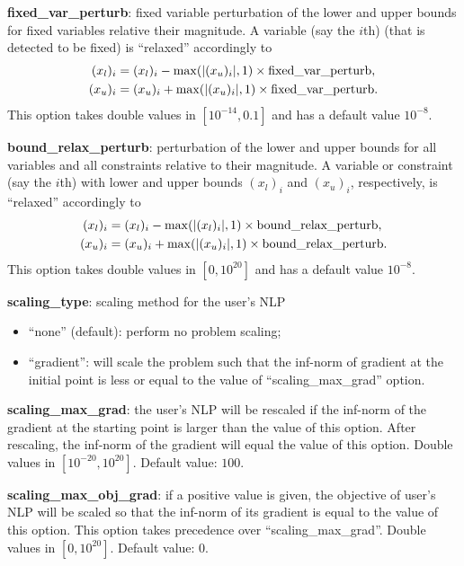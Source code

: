 \noindent \textbf{fixed\_var\_perturb}: fixed variable perturbation of the lower and upper bounds for fixed variables relative their  magnitude. A variable (say the $i$th) (that is detected to be fixed) is ``relaxed'' accordingly to 
\begin{align*}
(x_l)_i & =  (x_l)_i -  \max(|(x_u)_i|,1) \times \textnormal{fixed\_var\_perturb}, \\
(x_u)_i & =  (x_u)_i +  \max(|(x_u)_i|,1) \times \textnormal{fixed\_var\_perturb}.
\end{align*}
This option takes double values in $[10^{-14}, 0.1]$ and has a default value $10^{-8}$.
\medskip

\noindent \textbf{bound\_relax\_perturb}: perturbation of the lower and upper bounds for all variables and all constraints relative to their magnitude. A variable or constraint (say the $i$th) with lower and upper bounds $(x_l)_i$ and $(x_u)_i$, respectively,  is ``relaxed'' accordingly to 
\begin{align*}
(x_l)_i & =  (x_l)_i -  \max(|(x_l)_i|,1) \times \textnormal{bound\_relax\_perturb}, \\
(x_u)_i & =  (x_u)_i +  \max(|(x_u)_i|,1) \times \textnormal{bound\_relax\_perturb}.
\end{align*}
This option takes double values in $[0, 10^{20}]$ and has a default value $10^{-8}$.
\medskip

\noindent \textbf{scaling\_type}: scaling method for the user's NLP
\begin{itemize}
\item ``none'' (default): perform no problem scaling;
\item ``gradient'':  will scale the problem such that the inf-norm of gradient at the initial point is less or equal to the value of ``scaling\_max\_grad'' option.
\end{itemize}
\medskip

\noindent \textbf{scaling\_max\_grad}: the user's NLP will be rescaled if the inf-norm of the gradient at the starting point is larger than the value of this option. After rescaling, the inf-norm of the gradient will equal the value of this option. Double values in $[10^{-20}, 10^{20}]$. Default value: $100$.
\medskip

\noindent \textbf{scaling_max_obj_grad}: if a positive value is given, the objective of user's NLP will be scaled so that the inf-norm of its gradient is equal to the value of this option. This option takes precedence over ``scaling\_max\_grad''. Double values in $[0, 10^{20}]$. Default value: $0$.
\medskip

